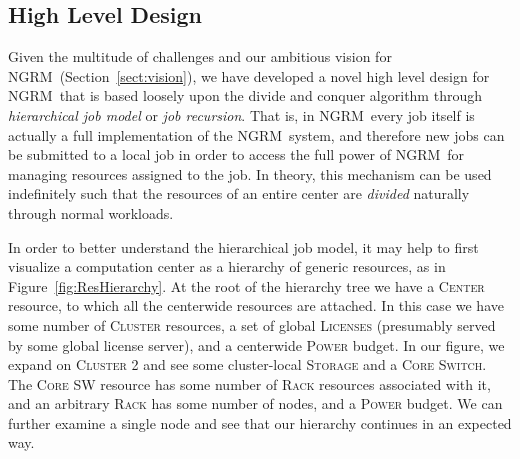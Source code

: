 \documentclass{article}
\newcommand{\ngrm}{NGRM}
\begin{document}
\subsection{High Level Design}

Given the multitude of challenges and our ambitious vision for
\ngrm\ (Section~\ref{sect:vision}), we have developed a novel
high level design for \ngrm\ that is based loosely upon the
divide and conquer algorithm through {\em hierarchical job model}
or {\em job recursion}. That
is, in \ngrm\ every job itself is actually a full implementation
of the \ngrm\ system, and therefore new jobs can be submitted to a
local job in order to access the full power of \ngrm\ for managing
resources assigned to the job. In theory, this mechanism can be
used indefinitely such that the resources of an entire center
are {\em divided} naturally through normal workloads.  

In order to better understand the hierarchical job model, it may help
to first visualize a computation center as a hierarchy
of generic resources, as in Figure~\ref{fig:ResHierarchy}. At
the root of the hierarchy tree we have a \textsc{Center} resource,
to which all the centerwide resources are attached.
In this case we have some number of \textsc{Cluster} resources,
a set of global \textsc{Licenses} (presumably served by some global
license server), and a centerwide \textsc{Power} budget. In our figure,
we expand on \textsc{Cluster 2} and see some cluster-local
\textsc{Storage} and a \textsc{Core Switch}.  The \textsc{Core SW}
resource has some number of \textsc{Rack} resources associated
with it, and an arbitrary \textsc{Rack} has some number of nodes,
and a \textsc{Power} budget. We can further examine a single node
and see that our hierarchy continues in an expected way.
\end{document}
